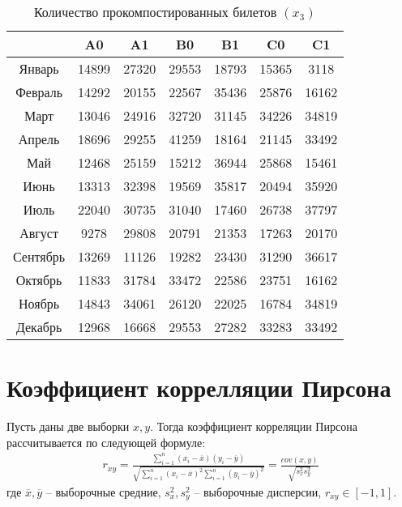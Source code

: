         \begin{table}[h!]%
        \centering
            \begin{tabular}{|c|c|c|c|c|c|c|} \hline
                    &   A0  &   A1  &   B0  &   B1  &   C0  &  C1   \\ \hline
            Январь  & 14899 & 27320 & 29553 & 18793 & 15365 & 3118  \\ \hline
            Февраль & 14292 & 20155 & 22567 & 35436 & 25876 & 16162 \\ \hline
            Март    & 13046 & 24916 & 32720 & 31145 & 34226 & 34819 \\ \hline
            Апрель  & 18696 & 29255 & 41259 & 18164 & 21145 & 33492 \\ \hline
            Май     & 12468 & 25159 & 15212 & 36944 & 25868 & 15461 \\ \hline
            Июнь    & 13313 & 32398 & 19569 & 35817 & 20494 & 35920 \\ \hline
            Июль    & 22040 & 30735 & 31040 & 17460 & 26738 & 37797 \\ \hline
            Август  & 9278  & 29808 & 20791 & 21353 & 17263 & 20170 \\ \hline
            Сентябрь& 13269 & 11126 & 19282 & 23430 & 31290 & 36617 \\ \hline
            Октябрь & 11833 & 31784 & 33472 & 22586 & 23751 & 16162 \\ \hline
            Ноябрь  & 14843 & 34061 & 26120 & 22025 & 16784 & 34819 \\ \hline
            Декабрь & 12968 & 16668 & 29553 & 27282 & 33283 & 33492 \\ \hline
            \end{tabular}
        \caption{Количество прокомпостированных билетов $(x_3)$}
        \end{table}

\section{Коэффициент коррелляции Пирсона}
    Пусть даны две выборки $x, y$.
    Тогда коэффициент корреляции Пирсона рассчитывается по следующей формуле:
    \begin{gather}
        r_{xy} = \frac{\sum\limits_{i=1}^n(x_i - \overline{x})(y_i - \overline{y})}{\sqrt{\sum\limits_{i=1}^n(x_i - \overline{x})^2\sum\limits_{i=1}^n(y_i - \overline{y})^2}} = \frac{cov(x, y)}{\sqrt{s_x^2s_y^2}}
    \end{gather}
    где $\overline{x}, \overline{y}$ -- выборочные средние, $s_x^2, s_y^2$ -- выборочные дисперсии, $r_{xy} \in [-1, 1]$.

